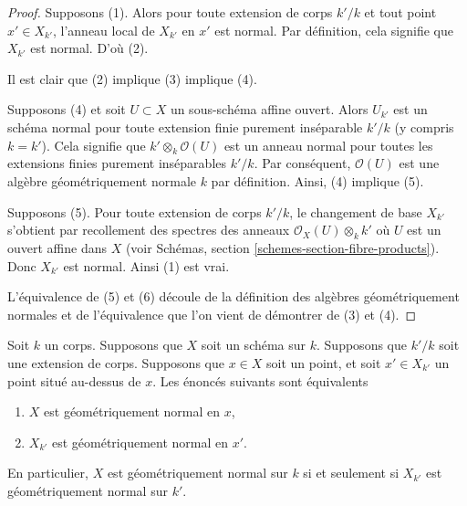\begin{proof}
Supposons (1). Alors pour toute extension de corps
$k'/k$ et tout point $x' \in X_{k'}$, l'anneau
local de $X_{k'}$ en $x'$ est normal. Par
définition, cela signifie que $X_{k'}$ est normal. D'où (2).

\medskip\noindent
Il est clair que (2) implique (3) implique (4).

\medskip\noindent
Supposons (4) et soit $U \subset X$ un sous-schéma affine
ouvert. Alors $U_{k'}$ est un schéma normal pour toute
extension finie purement inséparable $k'/k$ (y compris $k =
k'$). Cela signifie que $k' \otimes_k \mathcal{O}(U)$ est un
anneau normal pour toutes les extensions finies purement
inséparables $k'/k$. Par conséquent, $\mathcal{O}(U)$ est une algèbre
géométriquement normale $k$ par définition. Ainsi, (4) implique (5).

\medskip\noindent
Supposons (5). Pour toute extension de corps $k'/k$, le
changement de base $X_{k'}$ s'obtient par recollement des spectres
des anneaux $\mathcal{O}_X(U) \otimes_k k'$ où $U$ est un
ouvert affine dans $X$ (voir Schémas, section
\ref{schemes-section-fibre-products}). Donc $X_{k'}$ est normal. Ainsi (1) est vrai.

\medskip\noindent
L'équivalence de (5) et (6) découle de la
définition des algèbres géométriquement normales
et de l'équivalence que l'on vient de démontrer de (3) et (4).
\end{proof}

\begin{lemma}
\label{lemma-geometrically-normal-upstairs}
Soit $k$ un corps. Supposons que $X$
soit un schéma sur $k$. Supposons que $k'/k$ soit
une extension de corps. Supposons que $x \in X$ soit
un point, et soit $x' \in X_{k'}$ un point situé
au-dessus de $x$. Les énoncés suivants sont équivalents
\begin{enumerate}
\item $X$ est géométriquement normal en $x$,
\item $X_{k'}$ est géométriquement normal en $x'$.
\end{enumerate}
En particulier, $X$ est géométriquement normal sur $k$ si et
seulement si $X_{k'}$ est géométriquement normal sur $k'$.
\end{lemma}

